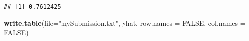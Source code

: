 \documentclass[
]{article}
\newenvironment{Shaded}{\begin{snugshade}}{\end{snugshade}}
\newcommand{\AttributeTok}[1]{\textcolor[rgb]{0.13,0.29,0.53}{#1}}
\newcommand{\ConstantTok}[1]{\textcolor[rgb]{0.56,0.35,0.01}{#1}}
\newcommand{\FunctionTok}[1]{\textcolor[rgb]{0.13,0.29,0.53}{\textbf{#1}}}
\newcommand{\NormalTok}[1]{#1}
\newcommand{\StringTok}[1]{\textcolor[rgb]{0.31,0.60,0.02}{#1}}
\begin{document}
\begin{verbatim}
## [1] 0.7612425
\end{verbatim}

\begin{Shaded}
\begin{Highlighting}[]
\FunctionTok{write.table}\NormalTok{(}\AttributeTok{file=}\StringTok{"mySubmission.txt"}\NormalTok{, yhat, }\AttributeTok{row.names =} \ConstantTok{FALSE}\NormalTok{, }\AttributeTok{col.names =} \ConstantTok{FALSE}\NormalTok{)}
\end{Highlighting}
\end{Shaded}
\end{document}
